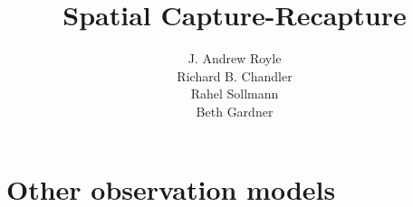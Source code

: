 \documentclass{book}
\begin{document}
\title{ Spatial Capture-Recapture  }
\subtitle{
}
\author{J. Andrew Royle \\
Richard B. Chandler \\
Rahel Sollmann \\
Beth Gardner}


\address{
USGS Patuxent Wildlife Research Center \\
North Carolina State University
}

\maketitle

\newpage

\setcounter{tocdepth}{2}
\tableofcontents











\chapter{Other observation models}
\label{chapt.poisson-mn}






\end{document}
